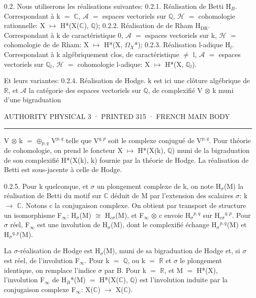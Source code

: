 \documentclass[10pt,twoside]{article}
\newcommand{\PageUnit}[3]{%
  \par\noindent\hypertarget{record-#1}{}%
  \pdfbookmark[1]{Authority page #1 · printed #2}{bookmark-#1}%
  {\sffamily\footnotesize\color{D030Muted}AUTHORITY PHYSICAL #1 · PRINTED #2 · #3}%
  \par\vspace{0.35em}\hrule height 0.35pt\vspace{0.8em}}
\begin{document}
0.2. Nous utiliserons les réalisations suivantes: 0.2.1. Réalisation de Betti H\ensuremath{_{B}}. Correspondant à k \ensuremath{=} \ensuremath{ℂ}, \ensuremath{𝒜} \ensuremath{=} espaces vectoriels sur \ensuremath{ℚ}, \ensuremath{ℋ} \ensuremath{=} cohomologie rationnelle: X \ensuremath{↦} H*(X(\ensuremath{ℂ}), \ensuremath{ℚ}); 0.2.2. Réalisation de de Rham H\ensuremath{_{\mathrm{DR}}}. Correspondant à k de caractéristique 0, \ensuremath{𝒜} \ensuremath{=} espaces vectoriels sur k, \ensuremath{ℋ} \ensuremath{=} cohomologie de de Rham: X \ensuremath{↦} H*(X, \ensuremath{Ω}\ensuremath{_{X}}*); 0.2.3. Réalisation l-adique H\ensuremath{_{l}}. Correspondant à k algébriquement clos, de caractéristique \ensuremath{≠} l, \ensuremath{𝒜} \ensuremath{=} espaces vectoriels sur \ensuremath{ℚ}\ensuremath{_{l}}, \ensuremath{ℋ} \ensuremath{=} cohomologie l-adique: X \ensuremath{↦} H*(X, \ensuremath{ℚ}\ensuremath{_{l}}).\par
Et leurs variantes: 0.2.4. Réalisation de Hodge. k est ici une clôture algébrique de \ensuremath{ℝ}, et \ensuremath{𝒜} la catégorie des espaces vectoriels sur \ensuremath{ℚ}, de complexifié V \ensuremath{⊗} k muni d’une bigraduation\par
\clearpage
\PageUnit{3}{315}{FRENCH MAIN BODY}
V \ensuremath{⊗} k \ensuremath{=} \ensuremath{⊕}\ensuremath{_{p,q}} V\ensuremath{^{p,q}} telle que V\ensuremath{^{q,p}} soit le complexe conjugué de V\ensuremath{^{p,q}}. Pour théorie de cohomologie, on prend le foncteur X \ensuremath{↦} H*(X(k), \ensuremath{ℚ}) muni de la bigraduation de son complexifié H*(X(k), k) fournie par la théorie de Hodge. La réalisation de Betti est sous-jacente à celle de Hodge.\par
0.2.5. Pour k quelconque, et \ensuremath{σ} un plongement complexe de k, on note H\ensuremath{_{σ}}(M) la réalisation de Betti du motif sur \ensuremath{ℂ} déduit de M par l’extension des scalaires \ensuremath{σ}: k \ensuremath{→} \ensuremath{ℂ}. Notons c la conjugaison complexe. On obtient par transport de structure un isomorphisme F\ensuremath{_{∞}}: H\ensuremath{_{σ}}(M) \ensuremath{≅} H\ensuremath{_{cσ}}(M), et F\ensuremath{_{∞}} \ensuremath{⊗} c envoie H\ensuremath{_{σ}}\ensuremath{^{p,q}} sur H\ensuremath{_{cσ}}\ensuremath{^{q,p}}. Pour \ensuremath{σ} réel, F\ensuremath{_{∞}} est une involution de H\ensuremath{_{σ}}(M), dont le complexifié échange H\ensuremath{_{σ}}\ensuremath{^{p,q}}(M) et H\ensuremath{_{σ}}\ensuremath{^{q,p}}(M).\par
La \ensuremath{σ}-réalisation de Hodge est H\ensuremath{_{σ}}(M), muni de sa bigraduation de Hodge et, si \ensuremath{σ} est réel, de l’involution F\ensuremath{_{∞}}. Pour k \ensuremath{=} \ensuremath{ℚ}, ou k \ensuremath{=} \ensuremath{ℝ} et \ensuremath{σ} le plongement identique, on remplace l’indice \ensuremath{σ} par B. Pour k \ensuremath{=} \ensuremath{ℝ}, et M \ensuremath{=} H*(X), l’involution F\ensuremath{_{∞}} de H\ensuremath{_{B}}*(M) \ensuremath{=} H*(X(\ensuremath{ℂ}), \ensuremath{ℚ}) est l’involution induite par la conjugaison complexe F\ensuremath{_{∞}}: X(\ensuremath{ℂ}) \ensuremath{→} X(\ensuremath{ℂ}).\par
\end{document}
